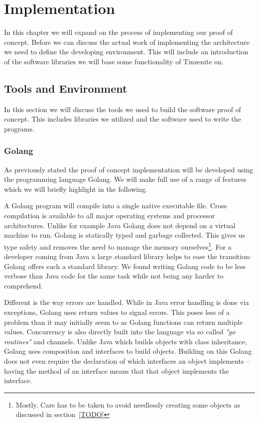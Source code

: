 \chapter{Implementation}
\label{chap:Implementation}

In this chapter we will expand on the process of implementing our proof of concept.
Before we can discuss the actual work of implementing the architecture we need to define the developing environment.
This will include an introduction of the software libraries we will base some functionality of Tinzenite on.

\section{Tools and Environment}
\label{sec:Tools and Environment}

In this section we will discuss the tools we used to build the software proof of concept.
This includes libraries we utilized and the software used to write the programs.

\subsection{Golang}
\label{sub:Golang}

As previously stated the proof of concept implementation will be developed using the programming language Golang.
We will make full use of a range of features which we will briefly highlight in the following.

A Golang program will compile into a single native executable file.
Cross compilation is available to all major operating systems and processor architectures.
Unlike for example Java Golang does not depend on a virtual machine to run.
Golang is statically typed and garbage collected.
This gives us type safety and removes the need to manage the memory ourselves\footnote{Mostly. Care has to be taken to avoid needlessly creating some objects as discussed in section~\ref{TODO}}.
For a developer coming from Java a large standard library helps to ease the transition: Golang offers such a standard library.
We found writing Golang code to be less verbose than Java code for the same task while not being any harder to comprehend.

Different is the way errors are handled.
While in Java error handling is done via exceptions, Golang uses return values to signal errors.
This poses less of a problem than it may initially seem to as Golang functions can return multiple values.
Concurrency is also directly built into the language via so called \textit{"go routines"} and channels.
Unlike Java which builds objects with class inheritance, Golang uses composition and interfaces to build objects.
Building on this Golang does not even require the declaration of which interfaces an object implements -- having the method of an interface means that that object implements the interface.

